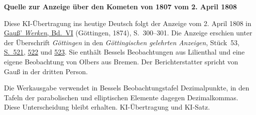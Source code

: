 \clearpage\thispagestyle{empty}
\begin{center}\textbf{Quelle zur Anzeige über den Kometen von 1807 vom 2. April 1808}\end{center}
\noindent Diese KI-Übertragung ins heutige Deutsch folgt der Anzeige vom 2. April 1808 in \href{https://gdz.sub.uni-goettingen.de/id/PPN236007467}{Gauß’ \textit{Werken}, Bd.~VI} (Göttingen, 1874), S.~300--301. Die Anzeige erschien unter der Überschrift \textit{Göttingen} in den \textit{Göttingischen gelehrten Anzeigen}, Stück~53, \href{https://manifests.sub.uni-goettingen.de/iiif/image/gdz:PPN319721507_1808:00000525/full/1600,/0/default.jpg}{S.~521}, \href{https://manifests.sub.uni-goettingen.de/iiif/image/gdz:PPN319721507_1808:00000526/full/1600,/0/default.jpg}{522} und \href{https://manifests.sub.uni-goettingen.de/iiif/image/gdz:PPN319721507_1808:00000527/full/1600,/0/default.jpg}{523}. Sie enthält Bessels Beobachtungen aus Lilienthal und eine eigene Beobachtung von Olbers aus Bremen. Der Berichterstatter spricht von Gauß in der dritten Person.
\par\medskip
Die Werkausgabe verwendet in Bessels Beobachtungstafel Dezimalpunkte, in den Tafeln der parabolischen und elliptischen Elemente dagegen Dezimalkommas. Diese Unterscheidung bleibt erhalten. KI-Übertragung und KI-Satz.
\clearpage
